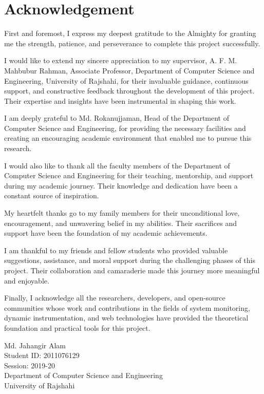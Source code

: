 
\chapter*{Acknowledgement}

First and foremost, I express my deepest gratitude to the Almighty for granting me the strength, patience, and perseverance to complete this project successfully.

I would like to extend my sincere appreciation to my supervisor, A. F. M. Mahbubur Rahman, Associate Professor, Department of Computer Science and Engineering, University of Rajshahi, for their invaluable guidance, continuous support, and constructive feedback throughout the development of this project. Their expertise and insights have been instrumental in shaping this work.

I am deeply grateful to Md. Rokanujjaman, Head of the Department of Computer Science and Engineering, for providing the necessary facilities and creating an encouraging academic environment that enabled me to pursue this research.

I would also like to thank all the faculty members of the Department of Computer Science and Engineering for their teaching, mentorship, and support during my academic journey. Their knowledge and dedication have been a constant source of inspiration.

My heartfelt thanks go to my family members for their unconditional love, encouragement, and unwavering belief in my abilities. Their sacrifices and support have been the foundation of my academic achievements.

I am thankful to my friends and fellow students who provided valuable suggestions, assistance, and moral support during the challenging phases of this project. Their collaboration and camaraderie made this journey more meaningful and enjoyable.

Finally, I acknowledge all the researchers, developers, and open-source communities whose work and contributions in the fields of system monitoring, dynamic instrumentation, and web technologies have provided the theoretical foundation and practical tools for this project.

\vspace{1cm}
\begin{flushright}
Md. Jahangir Alam\\
Student ID: 2011076129\\
Session: 2019-20\\
Department of Computer Science and Engineering\\
University of Rajshahi
\end{flushright}